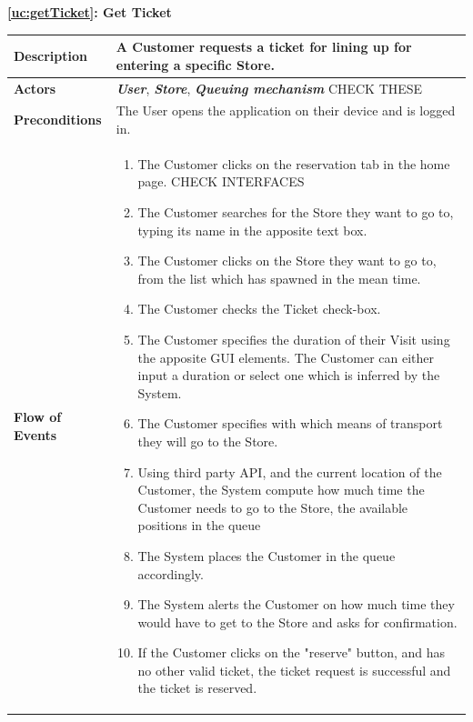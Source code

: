 \documentclass[a4paper, 10pt, oneside]{article}
\newcommand*{\lorenzo}[1]{\textcolor{BurntOrange}{#1}}
\begin{document}
\begin{center}
{\textbf{\ref{uc:getTicket}: Get Ticket}}
\end{center}
\begin{tabularx}{\linewidth}{| l | X |}
	
	\hline
	\textbf{Description} & A Customer requests a ticket for lining up for entering a specific Store.\\
	

	\hline
	\textbf{Actors} & \textbf{\textit{User}}, \textit{\textbf{Store}}, \textit{\textbf{Queuing mechanism}}  \lorenzo{CHECK THESE}\\
	
	\hline
	\textbf{Preconditions} & The User opens the application on their device and is logged in.\\
	
	\hline
	\textbf{Flow of Events} & \parbox{0.7\textwidth}{	
		\begin{enumerate}
		    \item The Customer clicks on the reservation tab in the home page. \lorenzo{CHECK INTERFACES}
			\item The Customer searches for the Store they want to go to, typing its name in the apposite text box.
			\item The Customer clicks on the Store they want to go to, from the list which has spawned in the mean time.
			\item The Customer checks the Ticket check-box.
			\item The Customer specifies the duration of their Visit using the apposite GUI elements. The Customer can either input a duration or select one which is inferred by the System.
			\item The Customer specifies with which means of transport they will go to the Store.
			\item Using third party API, and the current location of the Customer, the System compute how much time the Customer needs to go to the Store, the available positions in the queue
			\item The System places the Customer in the queue accordingly.
			\item The System alerts the Customer on how much time they would have to get to the Store and asks for confirmation.
			\item If the Customer clicks on the "reserve" button, and has no other valid ticket, the ticket request is successful and the ticket is reserved.
	\end{enumerate}}\\
	

\end{tabularx}
\end{document}
